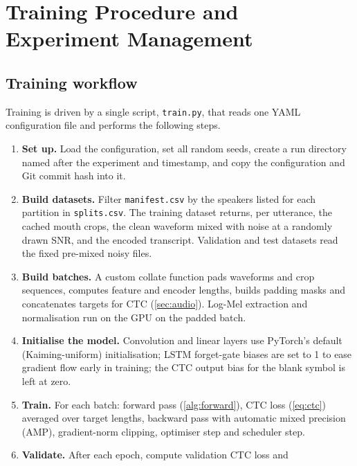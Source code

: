 \section{Training Procedure and Experiment Management}
\label{sec:training}

\subsection{Training workflow}
Training is driven by a single script, \texttt{train.py}, that reads one YAML
configuration file and performs the following steps.

\begin{enumerate}
  \item \textbf{Set up.} Load the configuration, set all random seeds, create a
        run directory named after the experiment and timestamp, and copy the
        configuration and Git commit hash into it.
  \item \textbf{Build datasets.} Filter \texttt{manifest.csv} by the speakers
        listed for each partition in \texttt{splits.csv}. The training dataset
        returns, per utterance, the cached mouth crops, the clean waveform mixed
        with noise at a randomly drawn SNR, and the encoded transcript. Validation
        and test datasets read the fixed pre-mixed noisy files.
  \item \textbf{Build batches.} A custom collate function pads waveforms and crop
        sequences, computes feature and encoder lengths, builds padding masks and
        concatenates targets for CTC (\cref{sec:audio}). Log-Mel extraction and
        normalisation run on the GPU on the padded batch.
  \item \textbf{Initialise the model.} Convolution and linear layers use PyTorch's
        default (Kaiming-uniform) initialisation; LSTM forget-gate biases are set
        to 1 to ease gradient flow early in training; the CTC output bias for the
        blank symbol is left at zero.
  \item \textbf{Train.} For each batch: forward pass (\cref{alg:forward}), CTC loss
        (\cref{eq:ctc}) averaged over target lengths, backward pass with automatic
        mixed precision (AMP), gradient-norm clipping, optimiser step and
        scheduler step.
  \item \textbf{Validate.} After each epoch, compute validation CTC loss and

\end{enumerate}
